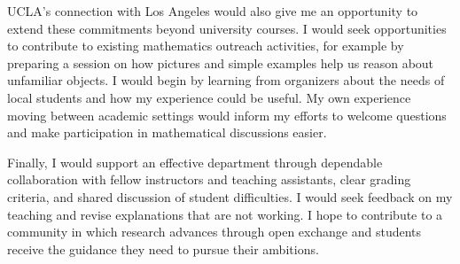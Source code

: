 \documentclass[11pt]{article}
\begin{document}
UCLA's connection with Los Angeles would also give me an opportunity to extend
these commitments beyond university courses. I would seek opportunities to
contribute to existing mathematics outreach activities, for example by preparing
a session on how pictures and simple examples help us reason about unfamiliar
objects. I would begin by learning from organizers about the needs of local
students and how my experience could be useful. My own experience moving between
academic settings would inform my efforts to welcome questions and make
participation in mathematical discussions easier.

Finally, I would support an effective department through dependable collaboration
with fellow instructors and teaching assistants, clear grading criteria, and
shared discussion of student difficulties. I would seek feedback on my teaching
and revise explanations that are not working. I hope to contribute to a community
in which research advances through open exchange and students receive the
guidance they need to pursue their ambitions.
\end{document}
